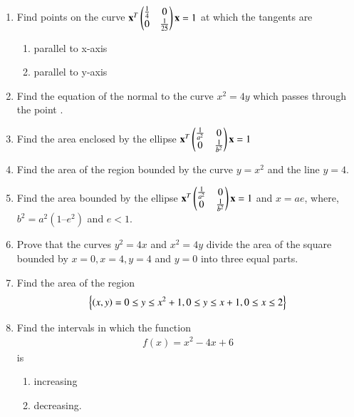 \begin{enumerate}[label=\arabic*.,ref=\thesubsection.\theenumi]
\begin{enumerate}
\end{enumerate}
%
\item Find points on the curve 
$
\mathbf{x}^T\begin{pmatrix}\frac{1}{4} & 0 \\ 0 & \frac{1}{25}\end{pmatrix}\mathbf{x} = 1
$
at which the tangents are 
\begin{enumerate}
\item parallel to x-axis
\item parallel to y-axis
\end{enumerate}
 \item Find the equation of the normal to the curve $x^2= 4y$
which passes through the point .
%
\item Find the area enclosed by the ellipse
$
\mathbf{x}^T\begin{pmatrix}\frac{1}{a^2} & 0 \\ 0 & \frac{1}{b^2}\end{pmatrix}\mathbf{x} = 1
$
%
\item Find the area of the region bounded by the curve $y = x^2$
and the line $y = 4$.
%
\item Find the area bounded by the ellipse
$
\mathbf{x}^T\begin{pmatrix}\frac{1}{a^2} & 0 \\ 0 & \frac{1}{b^2}\end{pmatrix}\mathbf{x} = 1
$
and $x = ae$, where, $b^2 = a^2 (1 – e^2 )$ and $e < 1$.
%
\item Prove that the curves $y^2 = 4x$ and $x^2 = 4y$ divide the area of the square bounded by $x = 0, x = 4, y =4$ and $y = 0$ into three equal parts.
%
\item Find the area of the region
\begin{align}
\left\{\left(x,y\right) = 0\le y\le x^2+1, 0\le y \le x+1, 0 \le x \le 2\right\}
\end{align}
\item Find the intervals in which the function 
\begin{align}
f(x)  = x^2-4x+6
\end{align}
%
is 
\begin{enumerate}
\item increasing
\item decreasing.
\end{enumerate}
%
%

\end{enumerate}
